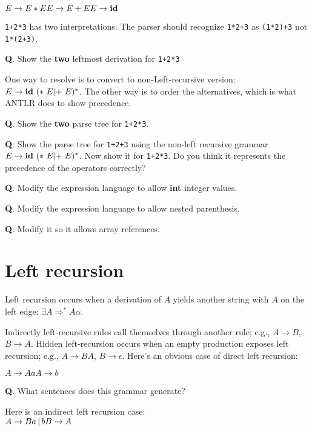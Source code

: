\documentclass[11pt,twocolumn,nocopyright]{sigplanconf}
\begin{document}
\noindent $
E \rightarrow E * E\\
E \rightarrow E + E\\
E \rightarrow {\bf id}\\
$

{\tt 1+2*3} has two interpretations. The parser should recognize {\tt 1*2+3} as {\tt (1*2)+3} not {\tt 1*(2+3)}.

{\bf Q}. Show the {\bf two} leftmost derivation for {\tt 1+2*3}

One way to resolve is to convert to non-Left-recursive version: $E \rightarrow {\bf id}\ (*\ E | {\bf +}\ E)^*$.  The other way is to order the alternatives, which is what ANTLR does to show precedence.

{\bf Q}. Show the {\bf two} parse tree for {\tt 1+2*3}.

{\bf Q}. Show the parse tree for {\tt 1+2+3} using the non-left recursive grammar $E \rightarrow {\bf id}\ (*\ E | {\bf +}\ E)^*$. Now show it for {\tt 1+2*3}. Do you think it represents the precedence of the operators correctly?

{\bf Q}. Modify the expression language to allow {\bf int} integer values. 

{\bf Q}. Modify the expression language to allow nested parenthesis. 

{\bf Q}. Modify it so it allows array references.

\section{Left recursion}

Left recursion occurs when a derivation of $A$ yields another string with $A$ on the left edge: $\exists A \Rightarrow^* A\alpha$.
 
Indirectly left-recursive rules call themselves through another rule; e.g., $A \rightarrow B$, $B \rightarrow A$. Hidden left-recursion occurs
when an empty production exposes left recursion; e.g., $A \rightarrow
B A$, $B \rightarrow \epsilon$.  Here's an obvious case of direct left recursion:

\noindent $
A \rightarrow A a\\
A \rightarrow b\\
$

{\bf Q}. What sentences does this grammar generate?

\noindent Here is an indirect left recursion case:\\

\noindent $
A \rightarrow Ba\, |\, b\\
B \rightarrow A\\
$
\end{document}
